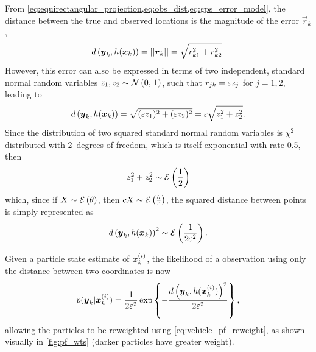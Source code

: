 From \cref{eq:equirectangular_projection,eq:obs_dist,eq:gps_error_model}, the distance between the true and observed locations is the magnitude of the error $\vec{r}_k$,
\begin{equation}
d\left(\boldsymbol{y}_k, h(\boldsymbol x_k)\right) = ||\boldsymbol{r}_k|| =
    \sqrt{r_{k1}^2 + r_{k2}^2}.
\end{equation}
However, this error can also be expressed in terms of two independent, standard normal random variables $z_1, z_2 \sim \mathcal{N}\left(0,\, 1\right)$, such that $r_{jk} = \varepsilon z_j$ for $j = 1, 2$, leading to
\begin{equation}
d\left(\boldsymbol{y}_k, h(\boldsymbol x_k)\right) =
    \sqrt{(\varepsilon z_1)^2 + (\varepsilon z_2)^2} =
    \varepsilon \sqrt{z_1^2 + z_2^2}.
\end{equation}
Since the distribution of two squared standard normal random variables is $\chi^2$ distributed with 2~degrees of freedom, which is itself exponential with rate 0.5, then
\begin{equation}
\label{eq:sum_sq_dist}
z_1^2 + z_2^2 \sim \mathcal{E}\left(\frac{1}{2}\right)
\end{equation}
which, since if $X \sim \mathcal{E}\left(\theta\right)$, then $cX \sim \mathcal{E}\left(\frac{\theta}{c}\right)$, the squared distance between points is simply represented as
\begin{equation}
\label{eq:distance_distrib}
d\left(\boldsymbol{y}_k, h(\boldsymbol x_k)\right)^2 \sim \mathcal{E}\left(\frac{1}{2\varepsilon^2}\right).
\end{equation}

Given a particle state estimate of $\boldsymbol x^{(i)}_k$,
the likelihood of a \GPS{} observation using only
the distance between two coordinates is now
\begin{equation}
\label{eq:particle_lh_fun}
p(\boldsymbol{y}_k | \boldsymbol x^{(i)}_k) =
    \frac{1}{2\varepsilon^2} \exp\left\{
        - \frac{d\left(\boldsymbol{y}_k, h(\boldsymbol x^{(i)}_k)\right)^2}{2\varepsilon^2}
    \right\},
\end{equation}
allowing the particles to be reweighted using \cref{eq:vehicle_pf_reweight}, as shown visually in \cref{fig:pf_wts} (darker particles have greater weight).


